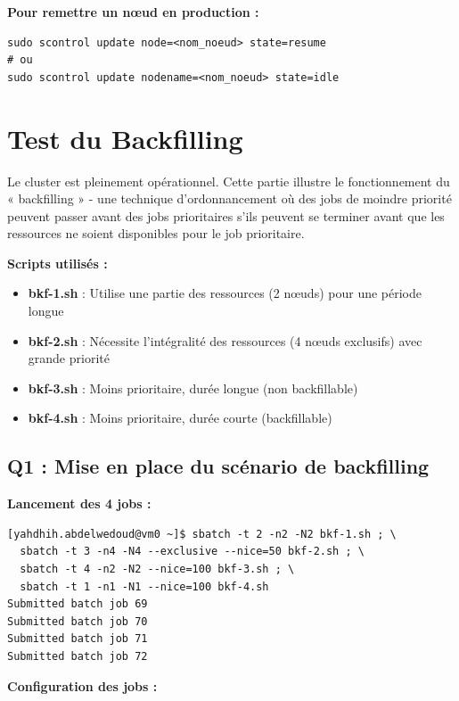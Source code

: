 \documentclass[12pt,a4paper]{article}
\begin{document}
\textbf{Pour remettre un nœud en production :}
\begin{lstlisting}
sudo scontrol update node=<nom_noeud> state=resume
# ou
sudo scontrol update nodename=<nom_noeud> state=idle
\end{lstlisting}

\section{Test du Backfilling}

Le cluster est pleinement opérationnel. Cette partie illustre le fonctionnement du « backfilling » - une technique d'ordonnancement où des jobs de moindre priorité peuvent passer avant des jobs prioritaires s'ils peuvent se terminer avant que les ressources ne soient disponibles pour le job prioritaire.

\textbf{Scripts utilisés :}
\begin{itemize}
    \item \textbf{bkf-1.sh} : Utilise une partie des ressources (2 nœuds) pour une période longue
    \item \textbf{bkf-2.sh} : Nécessite l'intégralité des ressources (4 nœuds exclusifs) avec grande priorité
    \item \textbf{bkf-3.sh} : Moins prioritaire, durée longue (non backfillable)
    \item \textbf{bkf-4.sh} : Moins prioritaire, durée courte (backfillable)
\end{itemize}

\subsection{Q1 : Mise en place du scénario de backfilling}

\textbf{Lancement des 4 jobs :}
\begin{lstlisting}
[yahdhih.abdelwedoud@vm0 ~]$ sbatch -t 2 -n2 -N2 bkf-1.sh ; \
  sbatch -t 3 -n4 -N4 --exclusive --nice=50 bkf-2.sh ; \
  sbatch -t 4 -n2 -N2 --nice=100 bkf-3.sh ; \
  sbatch -t 1 -n1 -N1 --nice=100 bkf-4.sh 
Submitted batch job 69
Submitted batch job 70
Submitted batch job 71
Submitted batch job 72
\end{lstlisting}

\textbf{Configuration des jobs :}
\end{document}
